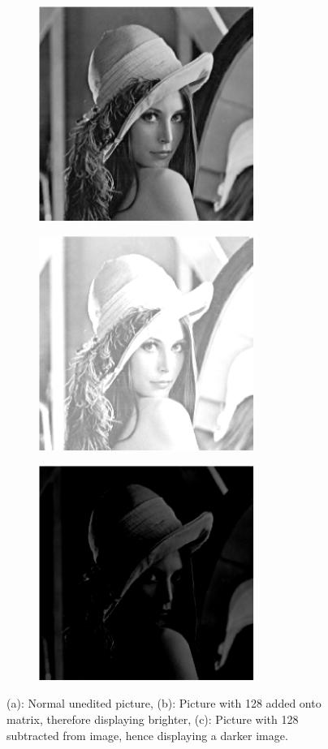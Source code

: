 \documentclass[11pt]{article}
\begin{document}
\begin{figure}[H]
\centering
\begin{subfigure}{.49\textwidth}
	\centering
        \includegraphics[width=\linewidth, height = 7cm]{pic.eps}
        \caption{}
        \label{normal}
\end{subfigure}
\begin{subfigure}{.49\textwidth}
	\centering
        \includegraphics[width=\linewidth,  height = 7cm]{newpic1.eps}
        \caption{}
        \label{brighter}
\end{subfigure}
\begin{subfigure}{.49\textwidth}
	\centering
        \includegraphics[width=\linewidth, height = 7cm]{newpic2.eps}
        \caption{}
        \label{darker}
\end{subfigure}
\caption{(a): Normal unedited picture, (b): Picture with 128 added onto matrix, therefore displaying brighter, (c): Picture with 128 subtracted from image, hence displaying a darker image.}
\label{Lenna}
\end{figure}
\end{document}

